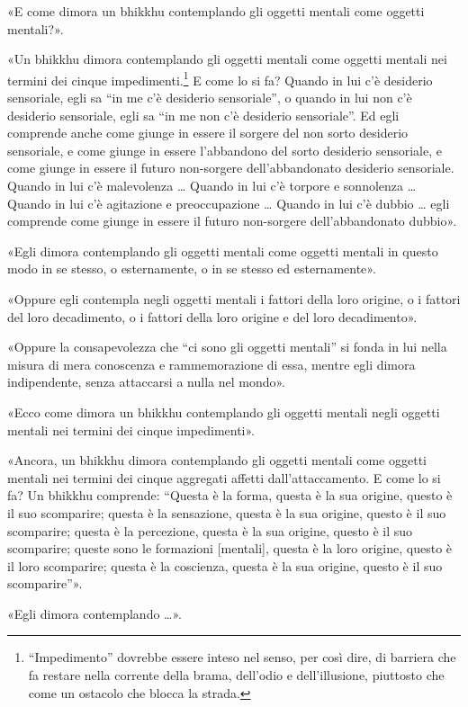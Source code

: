 «E come dimora un bhikkhu contemplando gli oggetti mentali come oggetti
mentali?».


«Un bhikkhu dimora contemplando gli oggetti mentali come oggetti mentali
nei termini dei cinque impedimenti.\footnote{“Impedimento” dovrebbe essere inteso nel senso, per così dire, di barriera che fa restare nella corrente della brama, dell’odio e dell’illusione, piuttosto che come un ostacolo che blocca la strada.}
E come lo si fa?
Quando in lui c’è desiderio sensoriale, egli sa “in me c’è desiderio
sensoriale”, o quando in lui non c’è desiderio sensoriale, egli sa “in
me non c’è desiderio sensoriale”. Ed egli comprende anche come giunge in
essere il sorgere del non sorto desiderio sensoriale, e come giunge in
essere l’abbandono del sorto desiderio sensoriale, e come giunge in
essere il futuro non-sorgere dell’abbandonato desiderio sensoriale.
Quando in lui c’è malevolenza … Quando in lui c’è torpore e sonnolenza …
Quando in lui c’è agitazione e preoccupazione … Quando in lui c’è dubbio
… egli comprende come giunge in essere il futuro non-sorgere
dell’abbandonato dubbio».


«Egli dimora contemplando gli oggetti mentali come oggetti mentali in
questo modo in se stesso, o esternamente, o in se stesso ed
esternamente».


«Oppure egli contempla negli oggetti mentali i fattori della loro
origine, o i fattori del loro decadimento, o i fattori della loro
origine e del loro decadimento».


«Oppure la consapevolezza che “ci sono gli oggetti mentali” si fonda in
lui nella misura di mera conoscenza e rammemorazione di essa, mentre
egli dimora indipendente, senza attaccarsi a nulla nel mondo».


«Ecco come dimora un bhikkhu contemplando gli oggetti mentali negli
oggetti mentali nei termini dei cinque impedimenti».


«Ancora, un bhikkhu dimora contemplando gli oggetti mentali come oggetti
mentali nei termini dei cinque aggregati affetti dall’attaccamento. E
come lo si fa? Un bhikkhu comprende: “Questa è la forma, questa è la sua
origine, questo è il suo scomparire; questa è la sensazione, questa è la
sua origine, questo è il suo scomparire; questa è la percezione, questa
è la sua origine, questo è il suo scomparire; queste sono le formazioni
[mentali], questa è la loro origine, questo è il loro scomparire; questa
è la coscienza, questa è la sua origine, questo è il suo scomparire”».


«Egli dimora contemplando …».


